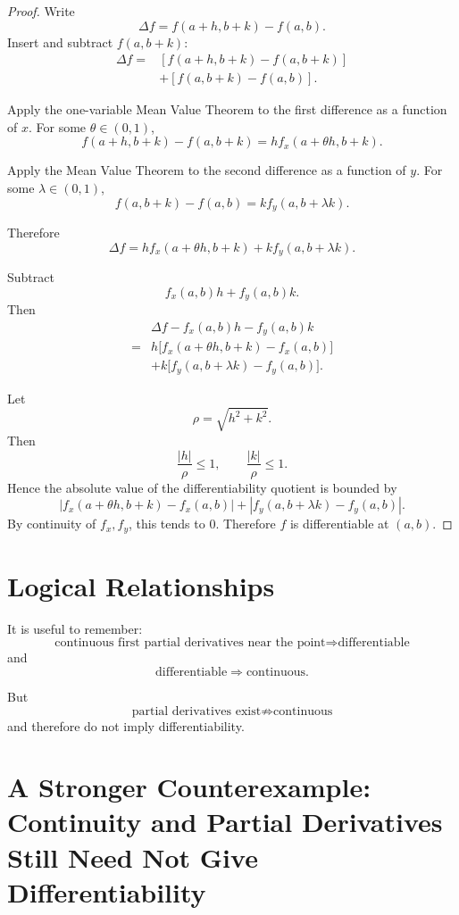 \documentclass[11pt,oneside]{book}
\theoremstyle{studentthm}
\theoremstyle{definition}
\newcommand{\abs}[1]{\left|#1\right|}
\begin{document}
\begin{proof}
Write
\[
\Delta f=f(a+h,b+k)-f(a,b).
\]
Insert and subtract \(f(a,b+k)\):
\[
\begin{aligned}
\Delta f
={}&
[f(a+h,b+k)-f(a,b+k)]\\
&+[f(a,b+k)-f(a,b)].
\end{aligned}
\]

Apply the one-variable Mean Value Theorem to the first difference as a
function of \(x\). For some \(\theta\in(0,1)\),
\[
f(a+h,b+k)-f(a,b+k)
=
h f_x(a+\theta h,b+k).
\]

Apply the Mean Value Theorem to the second difference as a function of
\(y\). For some \(\lambda\in(0,1)\),
\[
f(a,b+k)-f(a,b)
=
k f_y(a,b+\lambda k).
\]

Therefore
\[
\Delta f
=
h f_x(a+\theta h,b+k)
+
k f_y(a,b+\lambda k).
\]

Subtract
\[
f_x(a,b)h+f_y(a,b)k.
\]
Then
\[
\begin{aligned}
&
\Delta f-f_x(a,b)h-f_y(a,b)k\\
={}&
h\bigl[
f_x(a+\theta h,b+k)-f_x(a,b)
\bigr]\\
&+
k\bigl[
f_y(a,b+\lambda k)-f_y(a,b)
\bigr].
\end{aligned}
\]

Let
\[
\rho=\sqrt{h^2+k^2}.
\]
Then
\[
\frac{\abs h}{\rho}\le1,
\qquad
\frac{\abs k}{\rho}\le1.
\]
Hence the absolute value of the differentiability quotient is bounded
by
\[
\abs{f_x(a+\theta h,b+k)-f_x(a,b)}
+
\abs{f_y(a,b+\lambda k)-f_y(a,b)}.
\]
By continuity of \(f_x,f_y\), this tends to \(0\). Therefore \(f\) is
differentiable at \((a,b)\).
\end{proof}

\section{Logical Relationships}

It is useful to remember:
\[
\text{continuous first partial derivatives near the point}
\Longrightarrow
\text{differentiable}
\]
and
\[
\text{differentiable}
\Longrightarrow
\text{continuous}.
\]

But
\[
\text{partial derivatives exist}
\not\Rightarrow
\text{continuous}
\]
and therefore do not imply differentiability.


\section{A Stronger Counterexample: Continuity and Partial Derivatives Still Need Not Give Differentiability}
\end{document}
